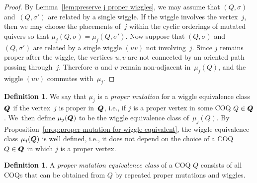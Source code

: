 \documentclass[11pt, letterpaper]{amsart}
\newcommand{\wiggleQ}{Q \hspace{-7pt} Q}%
\theoremstyle{definition}
\newtheorem{remark}[theorem]{Remark}
\newtheorem{definition}[theorem]{Definition}
\numberwithin{equation}{section}
\begin{document}
\begin{proof}
By Lemma~\ref{lem:preserve j proper wiggles}, we may assume that $(Q,\sigma)$ and~$(Q,\sigma')$ 
are related by a single wiggle. 
If the wiggle involves the vertex~$j$, then we may choose the placements of~$j$ 
within the cyclic orderings of mutated quivers so that $\mu_j(Q,\sigma) = \mu_j(Q,\sigma')$. 
Now suppose that $(Q,\sigma)$ and~$(Q,\sigma')$ are related by a single wiggle $(uv)$ not involving~$j$. 
Since $j$ remains proper after the wiggle, the vertices $u,v$ 
are not connected by an oriented path passing through~$j$. 
Therefore $u$ and $v$ remain non-adjacent in~$\mu_j(Q)$, and the wiggle $(u v)$ commutes with~$\mu_j$.
\end{proof}

\begin{definition}
\label{def:wiggle class mutation}
We say that $\mu_j$ is a \emph{proper mutation} for a wiggle equivalence class~$\wiggleQ$
if the vertex~$j$ is proper in~$\wiggleQ$, 
i.e., if $j$ is a proper vertex in some COQ $Q\in\wiggleQ$. \linebreak[3] 
We~then define $\mu_j(\wiggleQ)$ to be the wiggle equivalence class of~$\mu_j(Q)$.
By Proposition~\ref{prop:proper mutation for wiggle equivalent}, 
the wiggle equivalence class $\mu_j(\wiggleQ)$ is well defined, i.e., it does not depend on the choice of 
a COQ $Q\in\wiggleQ$ in which $j$ is a proper vertex.
\end{definition}



\begin{definition}
 A \emph{proper mutation equivalence class} of a COQ $Q$ consists of all COQs 
 that can be obtained from $Q$ by repeated proper mutations and wiggles.
\end{definition}
\end{document}

